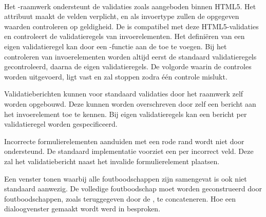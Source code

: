 \paragraph{\kendo}
Het \kendo{}-raamwerk ondersteunt de validaties zoals aangeboden binnen HTML5.
Het  attribuut maakt de velden verplicht,  en  als invoertype zullen de opgegeven waarden controleren op geldigheid.
De \kendo{}  is compatibel met deze HTML5-validaties en controleert de validatieregels van invoerelementen.
Het definiëren van een eigen validatieregel kan door een \js-functie aan de  toe te voegen.
Bij het controleren van invoerelementen worden altijd eerst de standaard validatieregels gecontroleerd,  daarna de eigen validatieregels.
De volgorde waarin de controles worden uitgevoerd, ligt vast en zal stoppen zodra één controle mislukt.

Validatieberichten kunnen voor standaard validaties door het raamwerk zelf worden opgebouwd.
Deze kunnen worden overschreven door zelf een bericht aan het invoerelement toe te kennen.
Bij eigen validatieregels kan een bericht per validatieregel worden gespecificeerd.

Incorrecte formulierelementen aanduiden met een rode rand wordt niet door \kendo{} ondersteund.
De standaard implementatie voorziet een  per incorrect veld.
Deze zal het validatiebericht naast het invalide formulierelement plaatsen. 

Een venster tonen waarbij alle foutboodschappen zijn samengevat is ook niet standaard aanwezig.
De volledige foutboodschap moet worden geconstrueerd door foutboodschappen,  zoals teruggegeven door de , te concateneren.
Hoe een dialoogvenster gemaakt wordt werd in  besproken.


